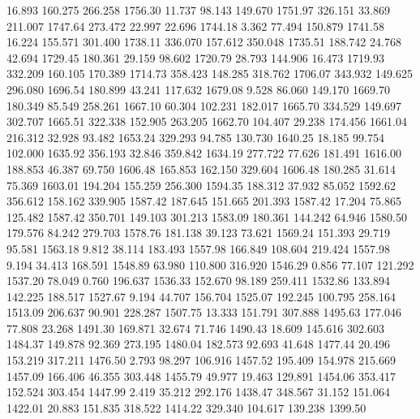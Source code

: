   16.893  160.275  266.258      1756.30
  11.737   98.143  149.670      1751.97
 326.151   33.869  211.007      1747.64
 273.472   22.997   22.696      1744.18
   3.362   77.494  150.879      1741.58
  16.224  155.571  301.400      1738.11
 336.070  157.612  350.048      1735.51
 188.742   24.768   42.694      1729.45
 180.361   29.159   98.602      1720.79
  28.793  144.906   16.473      1719.93
 332.209  160.105  170.389      1714.73
 358.423  148.285  318.762      1706.07
 343.932  149.625  296.080      1696.54
 180.899   43.241  117.632      1679.08
   9.528   86.060  149.170      1669.70
 180.349   85.549  258.261      1667.10
  60.304  102.231  182.017      1665.70
 334.529  149.697  302.707      1665.51
 322.338  152.905  263.205      1662.70
 104.407   29.238  174.456      1661.04
 216.312   32.928   93.482      1653.24
 329.293   94.785  130.730      1640.25
  18.185   99.754  102.000      1635.92
 356.193   32.846  359.842      1634.19
 277.722   77.626  181.491      1616.00
 188.853   46.387   69.750      1606.48
 165.853  162.150  329.604      1606.48
 180.285   31.614   75.369      1603.01
 194.204  155.259  256.300      1594.35
 188.312   37.932   85.052      1592.62
 356.612  158.162  339.905      1587.42
 187.645  151.665  201.393      1587.42
  17.204   75.865  125.482      1587.42
 350.701  149.103  301.213      1583.09
 180.361  144.242   64.946      1580.50
 179.576   84.242  279.703      1578.76
 181.138   39.123   73.621      1569.24
 151.393   29.719   95.581      1563.18
   9.812   38.114  183.493      1557.98
 166.849  108.604  219.424      1557.98
   9.194   34.413  168.591      1548.89
  63.980  110.800  316.920      1546.29
   0.856   77.107  121.292      1537.20
  78.049    0.760  196.637      1536.33
 152.670   98.189  259.411      1532.86
 133.894  142.225  188.517      1527.67
   9.194   44.707  156.704      1525.07
 192.245  100.795  258.164      1513.09
 206.637   90.901  228.287      1507.75
  13.333  151.791  307.888      1495.63
 177.046   77.808   23.268      1491.30
 169.871   32.674   71.746      1490.43
  18.609  145.616  302.603      1484.37
 149.878   92.369  273.195      1480.04
 182.573   92.693   41.648      1477.44
  20.496  153.219  317.211      1476.50
   2.793   98.297  106.916      1457.52
 195.409  154.978  215.669      1457.09
 166.406   46.355  303.448      1455.79
  49.977   19.463  129.891      1454.06
 353.417  152.524  303.454      1447.99
   2.419   35.212  292.176      1438.47
 348.567   31.152  151.064      1422.01
  20.883  151.835  318.522      1414.22
 329.340  104.617  139.238      1399.50
